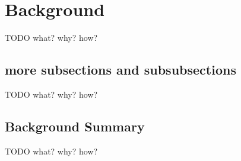 
\chapter{Background}
TODO what? why? how?
\section{more subsections and subsubsections}
TODO what? why? how?
\section{Background Summary}
TODO what? why? how?






